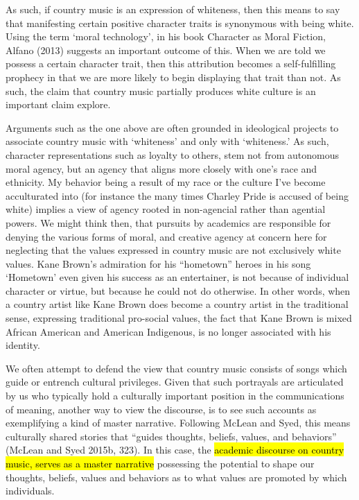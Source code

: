 \documentclass[
  letterpaper,
  DIV=11,
  numbers=noendperiod]{scrartcl}
\theoremstyle{remark}
\begin{document}
As such, if country music is an expression of whiteness, then this means
to say that manifesting certain positive character traits is synonymous
with being white. Using the term `moral technology', in his book
Character as Moral Fiction, Alfano (2013) suggests an important outcome
of this. When we are told we possess a certain character trait, then
this attribution becomes a self-fulfilling prophecy in that we are more
likely to begin displaying that trait than not. As such, the claim that
country music partially produces white culture is an important claim
explore.

Arguments such as the one above are often grounded in ideological
projects to associate country music with `whiteness' and only with
`whiteness.' As such, character representations such as loyalty to
others, stem not from autonomous moral agency, but an agency that aligns
more closely with one's race and ethnicity. My behavior being a result
of my race or the culture I've become acculturated into (for instance
the many times Charley Pride is accused of being white) implies a view
of agency rooted in non-agencial rather than agential powers. We might
think then, that pursuits by academics are responsible for denying the
various forms of moral, and creative agency at concern here for
neglecting that the values expressed in country music are not
exclusively white values. Kane Brown's admiration for his ``hometown''
heroes in his song `Hometown' even given his success as an entertainer,
is not because of individual character or virtue, but because he could
not do otherwise. In other words, when a country artist like Kane Brown
does become a country artist in the traditional sense, expressing
traditional pro-social values, the fact that Kane Brown is mixed African
American and American Indigenous, is no longer associated with his
identity.

We often attempt to defend the view that country music consists of songs
which guide or entrench cultural privileges. Given that such portrayals
are articulated by us who typically hold a culturally important position
in the communications of meaning, another way to view the discourse, is
to see such accounts as exemplifying a kind of master narrative.
Following McLean and Syed, this means culturally shared stories that
``guides thoughts, beliefs, values, and behaviors'' (McLean and Syed
2015b, 323). In this case, the \hl{academic discourse on country music,
serves as a master narrative} possessing the potential to shape our
thoughts, beliefs, values and behaviors as to what values are promoted
by which individuals.
\end{document}
